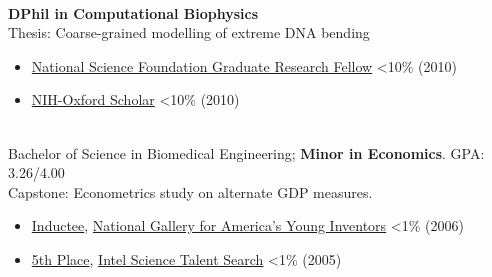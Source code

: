 \documentclass[margin]{res}
\begin{document}
 
\begin{sloppypar}
 

 


\begin{resume} 
\textheight 9.5in %
\setlength{\parskip}{1.00ex}
\setlength{\parindent}{0pt}
 
\\
\textbf{DPhil in Computational Biophysics} \\
Thesis: Coarse-grained modelling of extreme DNA bending
\begin{itemize}
    \item \href{http://www.nsfgrfp.org}{National Science Foundation Graduate Research Fellow} <10\% (2010)
    \item \href{http://oxcam.gpp.nih.gov}{NIH-Oxford Scholar} <10\% (2010)
\end{itemize}


\\
Bachelor of Science in Biomedical Engineering; \textbf{Minor in Economics}. GPA: 3.26/4.00 \\
Capstone: Econometrics study on alternate GDP measures.
\begin{itemize}
    \item \href{http://www.nmoe.org/gallery/2006/harrison.htm}{Inductee}, \href{http://www.nmoe.org/gallery/}{National Gallery for America's Young Inventors} <1\% (2006)
    \item \href{http://sciserv.org/sts/64sts/winners.asp}{5th Place}, \href{https://student.societyforscience.org/intel-sts}{Intel Science Talent Search} <1\% (2005)
\end{itemize}



\end{resume}
\end{sloppypar}
\end{document}
